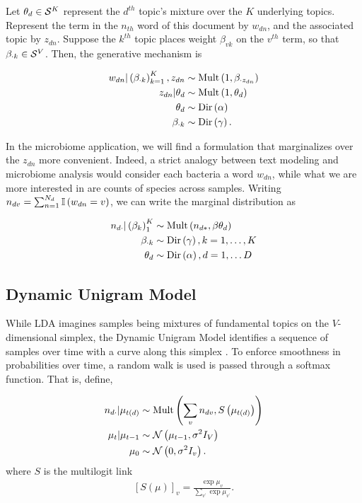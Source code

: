 \documentclass[oupdraft]{bio}
\begin{document}
Let $\theta_{d} \in \mathcal{S}^{K}$ represent the $d^{th}$ topic's mixture over the
$K$ underlying topics. Represent the term in the $n_{th}$ word of this document
by $w_{dn}$, and the associated topic by $z_{dn}$. Suppose the $k^{th}$ topic
places weight $\beta_{vk}$ on the $v^{th}$ term, so that $\beta_{\cdot k} \in
\mathcal{S}^{V}$. Then, the generative mechanism is

\begin{align*}
w_{dn} \vert \left(\beta_{\cdot k}\right)_{k = 1}^{K}, z_{dn} &\sim \textnormal{Mult}\left(1, \beta_{\cdot z_{dn}}\right) \\
z_{dn} \vert \theta_{d} &\sim \textnormal{Mult}\left(1, \theta_{d}\right) \\
\theta_{d} &\sim \textnormal{Dir}\left(\alpha\right) \\
\beta_{\cdot k} &\sim \textnormal{Dir}\left(\gamma\right).
\end{align*}


In the microbiome application, we will find a formulation that marginalizes over
the $z_{dn}$ more convenient. Indeed, a strict analogy between text modeling and
microbiome analysis would consider each bacteria a word $w_{dn}$, while
what we are more interested in are counts of species across samples.
Writing $n_{dv} = \sum_{n = 1}^{N_{d}} \mathbb{I}\left({w_{dn} = v}\right)$, we can write the
marginal distribution as

\begin{align*}
n_{d\cdot} \vert \left(\beta_{k}\right)_{1}^{K} &\sim \textnormal{Mult}\left(n_{d\ast}, \beta \theta_{d}\right) \\
\beta_{\cdot k} &\sim \textnormal{Dir}\left(\gamma\right), k = 1, \dots, K \\
\theta_{d} &\sim \textnormal{Dir}\left(\alpha\right), d = 1, \dots D
\end{align*}

\subsection{Dynamic Unigram Model}

While LDA imagines samples being mixtures of fundamental topics on the
$V$-dimensional simplex, the Dynamic Unigram Model identifies a sequence of
samples over time with a curve along this simplex \citep{blei2006dynamic}. To
enforce smoothness in probabilities over time, a random walk is used is
passed through a softmax function. That is, define,

\begin{align*}
n_{d\cdot} \vert \mu_{t\left(d\right)}  &\sim \textnormal{Mult}\left(\sum_{v} n_{dv}, S\left(\mu_{t\left(d\right)}\right)\right) \\
\mu_{t} \vert \mu_{t - 1} &\sim \mathcal{N}\left(\mu_{t - 1}, \sigma^{2}I_{V}\right) \\
\mu_{0} &\sim \mathcal{N}\left(0, \sigma^{2}I_{v}\right).
\end{align*}
where $S$ is the multilogit link
\begin{align*}
\left[S\left(\mu\right)\right]_{v} = \frac{\exp{\mu_{v}}}{\sum_{v^{\prime}} \exp{\mu_{v^{\prime}}}}.
\end{align*}
\end{document}
